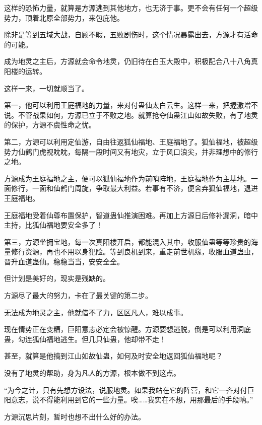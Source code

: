 \begin{this_body}
这样的恐怖力量，就算是方源逃到其他地方，也无济于事。更不会有任何一个超级势力，顶着北原全部势力，来包庇他。

除非是等到五域大战，自顾不暇，五败剧伤时，这个情况暴露出去，方源才有活命的可能。

成为地灵之主后，方源就会命令地灵，仍旧待在白玉大殿中，积极配合八十八角真阳楼的运转。

这样一来，一切就顺当了。

第一，他可以利用王庭福地的力量，来对付蛊仙太白云生。这样一来，把握激增不说。不管战果如何，方源已立于不败之地。就算抢夺仙蛊江山如故失败，有了地灵的保护，方源不虞性命之忧。

第二，方源可以利用定仙游，自由往返狐仙福地、王庭福地了。狐仙福地，被超级势力仙鹤门虎视眈眈，每隔一段时间又有地灾，立于风口浪尖，并非理想中的修行之地。

方源成为王庭福地之主，便可以狐仙福地作为前哨阵地，王庭福地作为主基地。一面修行，一面和仙鹤门周旋，争取最大利益。若事有不济，便舍弃狐仙福地，退进王庭福地。

王庭福地受着仙尊布置保护，智道蛊仙推演困难。再加上方源日后修补漏洞，暗中主持，比狐仙福地要安全多了！

第三，方源坐拥宝地，每一次真阳楼开启，都能混入其中，收服仙蛊等等珍贵的海量修行资源，再也不用以身犯险。等到良机到来，重走前世机缘，收服血道蛊虫，晋升血道蛊仙。稳稳当当，安安全全。

但计划是美好的，现实是残缺的。

方源尽了最大的努力，卡在了最关键的第二步。

无法成为地灵之主，他就借不了力，区区凡人，难以成事。

现在情势正在变糟，巨阳意志必定会被惊醒。方源要想逃脱，倒是可以利用洞底蛊，勾连狐仙福地逃生。但几只仙蛊，他却带不走！

甚至，就算是他搞到江山如故仙蛊，如何及时安全地返回狐仙福地呢？

没有了地灵的帮助，身为凡人的方源，根本做不到这点。

“为今之计，只有先想方设法，说服地灵。如果我站在它的阵营，和它一齐对付巨阳意志，说不得能利用到它的一些力量。唉……我实在不想，用那最后的手段呐。”

方源沉思片刻，暂时也想不出什么好的办法。

\end{this_body}

